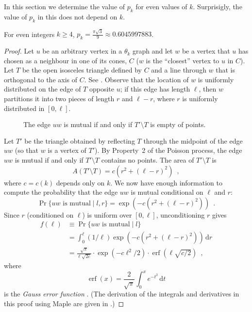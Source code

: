 \documentclass{patmorin}
\DeclareMathOperator{\erf}{erf}
\begin{document}
In this section we determine the value of $p_k$ for even values of $k$.
Surprisigly, the value of $p_k$ in this does not depend on $k$.

\begin{lem}
 For even integers $k\ge 4$, $p_k=\frac{\pi\sqrt{3}}{9}\approx 0.6045997883$.
\end{lem}

\begin{proof}
  Let $u$ be an arbitrary vertex in a $\theta_k$ graph and let $w$
  be a vertex that $u$ has chosen as a neighbour in one of its cones,
  $C$ ($w$ is the ``closest'' vertex to $u$ in $C$).  Let $T$ be the
  open isosceles triangle defined by $C$ and a line
  through $w$ that is orthogonal to the axis of $C$. See .
  Observe that the location of $w$ is uniformly distributed on the
  edge of $T$ opposite $u$;  if this edge has length $\ell$, then $w$
  partitions it into two pieces of length $r$ and $\ell-r$, where $r$
  is uniformly distributed in $[0,\ell]$.

  \begin{figure}
    \caption{The edge $uw$ is mutual if and only if $T'\setminus T$ 
       is empty of points.}
  \end{figure}
 
  Let $T'$ be the triangle obtained by reflecting $T$ through the midpoint
  of the edge $uw$ (so that $w$ is a vertex of $T'$). By Property~2 of the
  Poisson process, the edge $uw$ is mutual if and only if $T'\setminus T$
  contains no points.  The area of $T'\setminus T$ is
  \[
     A(T'\setminus T) = c(r^2+(\ell-r)^2)  \enspace ,
  \]
  where $c=c(k)$ depends only on $k$.  We now have enough information
  to compute the probability that the edge $uw$ is mutual conditional
  on $\ell$ and $r$:
  \[
    \Pr\{\mbox{$uw$ is mutual} \mid l,r\} = \exp(-c(r^2+(\ell-r)^2))
      \enspace .
  \]
  Since $r$ (conditioned on $\ell$) is uniform over $[0,\ell]$, unconditioning
  $r$ gives
  \begin{align*}
    f(\ell) & \equiv \Pr\{\mbox{$uw$ is mutual} \mid l\} \\
     & = \int_0^\ell (1/\ell)\exp(-c(r^2+(\ell-r)^2))\,\mathrm{d}r \\
     & = \frac{\sqrt{\pi}}{\ell\sqrt{2c}}
            \cdot\exp(-c\ell^2/2)
            \cdot\erf(\ell\sqrt{c/2})  \enspace ,
  \end{align*}
  where 
  \[ \erf(x)=\frac{2}{\sqrt{\pi}}\int_0^x e^{-t^2}\,\mathrm{d}t \]
  is the \emph{Gauss error function} \cite{gauss-error}.  (The derivation
  of the integrals and derivatives in this proof using Maple are given
  in .)


\end{proof}
\end{document}
